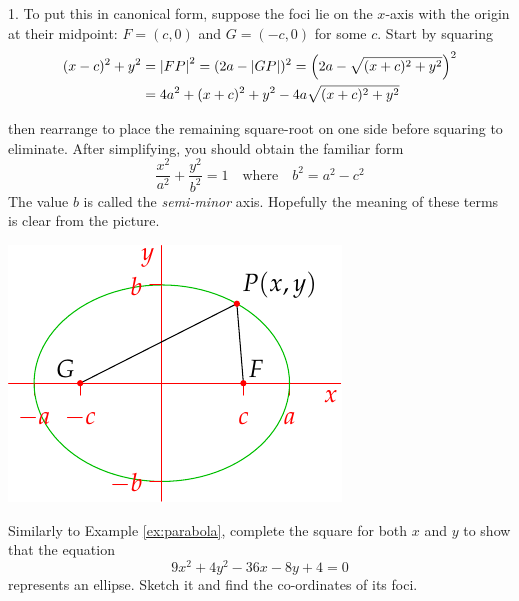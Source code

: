 \begin{exercises}{}{}
\hangindent\leftmargini
\textup{1. } To put this in canonical form, suppose the foci lie on the $x$-axis with the origin at their midpoint: $F=(c,0)$ and $G=(-c,0)$ for some $c$. Start by squaring
\begin{align*}
(x-c)^2+y^2&=\left| FP\right|^2=(2a-\left| GP\right|)^2=\left(2a-\sqrt{(x+c)^2+y^2}\right)^2\\
&=4a^2+(x+c)^2+y^2-4a\sqrt{(x+c)^2+y^2}
\end{align*}

\begin{enumerate}\setcounter{enumi}{1}
  \begin{minipage}[t]{0.6\linewidth}\vspace{-10pt}
\item[]then rearrange to place the remaining square-root on one side before squaring to eliminate. After simplifying, you should obtain the familiar form
\[\frac{x^2}{a^2}+\frac{y^2}{b^2}=1\quad\text{where}\quad b^2=a^2-c^2\]
The value $b$ is called the \emph{semi-minor} axis. Hopefully the meaning of these terms is clear from the picture.
\end{minipage}\begin{minipage}[t]{0.4\linewidth}\vspace{-30pt}
\flushright\includegraphics{ellipse2}
\end{minipage}
	
	\goodbreak

  \item Similarly to Example \ref{ex:parabola}, complete the square for both $x$ and $y$ to show that the equation
\[9x^2+4y^2-36x-8y+4=0\]
represents an ellipse. Sketch it and find the co-ordinates of its foci.



\end{enumerate}
\end{exercises}
